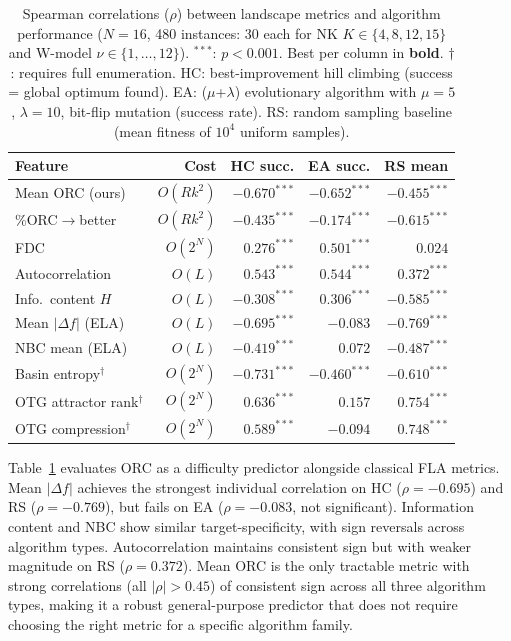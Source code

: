 \documentclass[runningheads]{llncs}
\begin{document}
\begin{table}[t]
\caption{Spearman correlations ($\rho$) between landscape metrics and algorithm performance ($N\!=\!16$, 480 instances: 30 each for NK $K \in \{4, 8, 12, 15\}$ and W-model $\nu \in \{1, \ldots, 12\}$). $^{***}$: $p < 0.001$. Best per column in \textbf{bold}. $\dagger$: requires full enumeration. HC: best-improvement hill climbing (success = global optimum found). EA: ($\mu$+$\lambda$) evolutionary algorithm with $\mu\!=\!5$, $\lambda\!=\!10$, bit-flip mutation (success rate). RS: random sampling baseline (mean fitness of $10^4$ uniform samples).}
\label{tab:correlation}
\centering
\small
\begin{tabular}{@{}lrrrr@{}}
\toprule
\textbf{Feature} & \textbf{Cost} & \textbf{HC succ.} & \textbf{EA succ.} & \textbf{RS mean} \\
\midrule
Mean ORC (ours)            & $O(Rk^2)$ & $-0.670^{***}$ & $\mathbf{-0.652}^{***}$ & $-0.455^{***}$ \\
\%ORC$\to$better           & $O(Rk^2)$ & $-0.435^{***}$ & $-0.174^{***}$ & $-0.615^{***}$ \\
\midrule
FDC                        & $O(2^N)$  & $0.276^{***}$  & $0.501^{***}$  & $0.024$        \\
Autocorrelation            & $O(L)$    & $0.543^{***}$  & $0.544^{***}$  & $0.372^{***}$  \\
Info.\ content $H$         & $O(L)$    & $-0.308^{***}$ & $0.306^{***}$  & $-0.585^{***}$ \\
Mean $|\Delta f|$ (ELA)    & $O(L)$    & $\mathbf{-0.695}^{***}$ & $-0.083$       & $\mathbf{-0.769}^{***}$ \\
NBC mean (ELA)             & $O(L)$    & $-0.419^{***}$ & $0.072$        & $-0.487^{***}$ \\
Basin entropy$^\dagger$    & $O(2^N)$  & $-0.731^{***}$ & $-0.460^{***}$ & $-0.610^{***}$ \\
\midrule
OTG attractor rank$^\dagger$ & $O(2^N)$ & $0.636^{***}$ & $0.157$  & $0.754^{***}$ \\
OTG compression$^\dagger$   & $O(2^N)$ & $0.589^{***}$ & $-0.094$ & $0.748^{***}$ \\
\bottomrule
\end{tabular}
\end{table}

Table~\ref{tab:correlation} evaluates ORC as a difficulty predictor alongside classical FLA metrics.
Mean $|\Delta f|$ achieves the strongest individual correlation on HC ($\rho = -0.695$) and RS ($\rho = -0.769$), but fails on EA ($\rho = -0.083$, not significant).
Information content and NBC show similar target-specificity, with sign reversals across algorithm types.
Autocorrelation maintains consistent sign but with weaker magnitude on RS ($\rho = 0.372$).
Mean ORC is the only tractable metric with strong correlations (all $|\rho| > 0.45$) of consistent sign across all three algorithm types, making it a robust general-purpose predictor that does not require choosing the right metric for a specific algorithm family.
\end{document}
